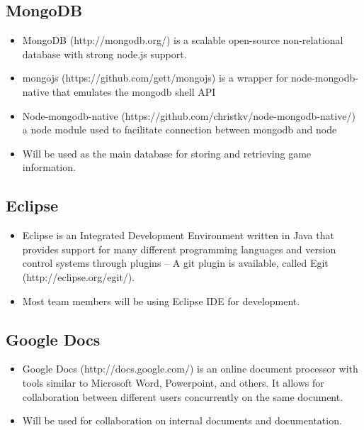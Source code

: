 \documentclass[letterpaper,12pt]{article}
\begin{document}
\subsection{MongoDB}
	\begin{itemize}
		\item MongoDB (http://mongodb.org/) is a scalable open-source non-relational database with strong node.js support.
		\item mongojs (https://github.com/gett/mongojs) is a wrapper for node-mongodb-native that emulates the mongodb shell API
		\item Node-mongodb-native (https://github.com/christkv/node-mongodb-native/) a node module used to facilitate connection between mongodb and node
		\item Will be used as the main database for storing and retrieving game information.
	\end{itemize}

\subsection{Eclipse}
	\begin{itemize}
		\item Eclipse is an Integrated Development Environment written in Java that provides support for many different programming languages and version control systems through plugins -- A git plugin is available, called Egit (http://eclipse.org/egit/).
		\item Most team members will be using Eclipse IDE for development.
	\end{itemize}
\subsection{Google Docs}
	\begin{itemize}
		\item Google Docs (http://docs.google.com/) is an online document processor with tools similar to Microsoft Word, Powerpoint, and others. It allows for collaboration between different users concurrently on the same document.
		\item Will be used for collaboration on internal documents and documentation.
	\end{itemize}
\end{document}
